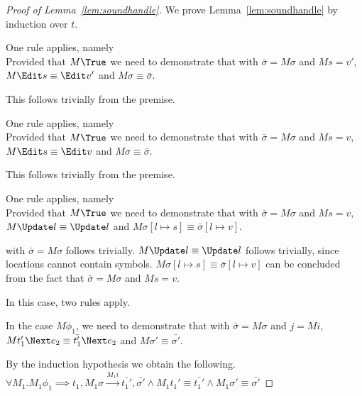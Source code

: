 \begin{proof}[Proof of Lemma~\ref{lem:soundhandle}]
  We prove Lemma~\ref{lem:soundhandle} by induction over $t$.\\

    {One rule applies, namely \\
    Provided that $M\True$ we need to demonstrate that  with $\bar{\sigma}=M\sigma$ and $M s = v'$,
    $M \Edit s\equiv \Edit v'$ and $ M\sigma\equiv \bar{\sigma}$.

    This follows trivially from the premise.

    }

  {One rule applies, namely \\
  Provided that $M\True$ we need to demonstrate that  with $\bar{\sigma}=M\sigma$ and $M s = v$,
  $M \Edit s \equiv \Edit v$ and $ M\sigma\equiv \bar{\sigma}$.

  This follows trivially from the premise.

  }

  {One rule applies, namely \\
  Provided that $M\True$
  we need to demonstrate that   with $\bar{\sigma}=M\sigma$ and $M s = v$,
  $M \Update l \equiv \Update l$ and $ M\sigma[l\mapsto s]\equiv \bar{\sigma}[l\mapsto v]$.

   with $\bar{\sigma}=M\sigma$ follows trivially.
  $M \Update l \equiv \Update l$ follows trivially, since locations cannot contain symbols. $ M\sigma[l\mapsto s]\equiv \bar{\sigma}[l\mapsto v]$ can be concluded from the fact that $\bar{\sigma}=M\sigma$ and $M s = v$.

  }

  {In this case, two rules apply.\\



  {In the case $M\phi_1$, we need to demonstrate that  with $\bar{\sigma}=M\sigma$ and $j= M i$,
  $M t_1' \Next e_2 \equiv \bar{t_1'}\Next e_2$ and $M\sigma'\equiv\bar{\sigma'}$.

  By the induction hypothesis we obtain the following.\\
  $\forall M_1 . M_1 \phi_1 \implies t_1,M_1\sigma \xrightarrow[]{M_1 i} \bar{t_1'},\bar{\sigma'}\land M_1 t_1'\equiv\bar{t_1'}\land M_1\sigma' \equiv \bar{\sigma'}$

}}
\end{proof}
